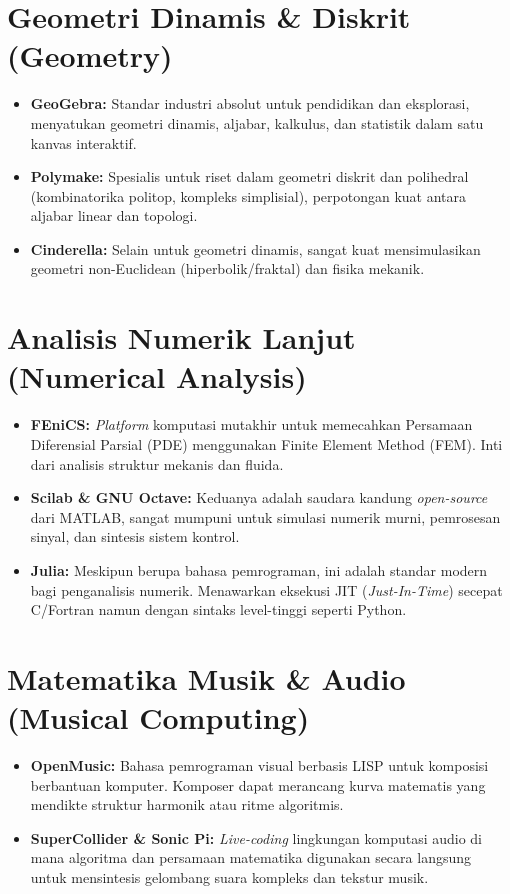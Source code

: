 \documentclass[11pt, a4paper, numbers=enddot, oneside]{scrbook}
\begin{document}
\section{Geometri Dinamis \& Diskrit (Geometry)}

\begin{itemize}
    \item \textbf{GeoGebra:} Standar industri absolut untuk pendidikan dan eksplorasi, menyatukan geometri dinamis, aljabar, kalkulus, dan statistik dalam satu kanvas interaktif.
    \item \textbf{Polymake:} Spesialis untuk riset dalam geometri diskrit dan polihedral (kombinatorika politop, kompleks simplisial), perpotongan kuat antara aljabar linear dan topologi.
    \item \textbf{Cinderella:} Selain untuk geometri dinamis, sangat kuat mensimulasikan geometri non-Euclidean (hiperbolik/fraktal) dan fisika mekanik.
\end{itemize}

\section{Analisis Numerik Lanjut (Numerical Analysis)}

\begin{itemize}
    \item \textbf{FEniCS:} \emph{Platform} komputasi mutakhir untuk memecahkan Persamaan Diferensial Parsial (PDE) menggunakan Finite Element Method (FEM). Inti dari analisis struktur mekanis dan fluida.
    \item \textbf{Scilab \& GNU Octave:} Keduanya adalah saudara kandung \emph{open-source} dari MATLAB, sangat mumpuni untuk simulasi numerik murni, pemrosesan sinyal, dan sintesis sistem kontrol.
    \item \textbf{Julia:} Meskipun berupa bahasa pemrograman, ini adalah standar modern bagi penganalisis numerik. Menawarkan eksekusi JIT (\emph{Just-In-Time}) secepat C/Fortran namun dengan sintaks level-tinggi seperti Python.
\end{itemize}

\section{Matematika Musik \& Audio (Musical Computing)}

\begin{itemize}
    \item \textbf{OpenMusic:} Bahasa pemrograman visual berbasis LISP untuk komposisi berbantuan komputer. Komposer dapat merancang kurva matematis yang mendikte struktur harmonik atau ritme algoritmis.
    \item \textbf{SuperCollider \& Sonic Pi:} \emph{Live-coding} lingkungan komputasi audio di mana algoritma dan persamaan matematika digunakan secara langsung untuk mensintesis gelombang suara kompleks dan tekstur musik.
\end{itemize}
\end{document}
